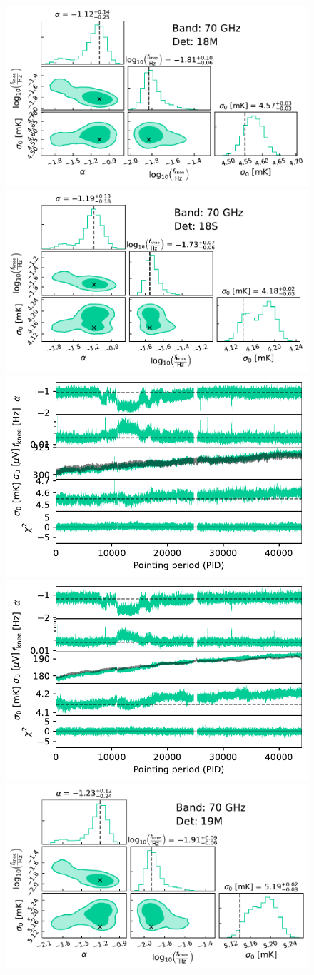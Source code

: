 \documentclass[twocolumn]{aa}
\begin{document}
\begin{figure}[p]
	\begin{center}
		\includegraphics[width=0.495\linewidth]{figs/corner_band_070_det_1_mean.pdf}
		\includegraphics[width=0.495\linewidth]{figs/corner_band_070_det_2_mean.pdf}\\
		\includegraphics[width=0.495\linewidth]{figs/xi_vs_pid_band_070_det_1_mean.pdf}
		\includegraphics[width=0.495\linewidth]{figs/xi_vs_pid_band_070_det_2_mean.pdf}\\
		\vspace*{1mm}
		\includegraphics[width=0.495\linewidth]{figs/corner_band_070_det_3_mean.pdf}

\end{center}
\end{figure}
\end{document}
